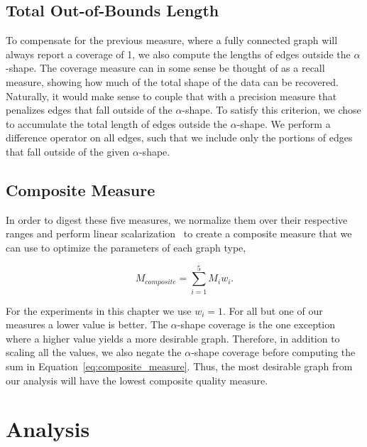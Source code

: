 \subsection{Total Out-of-Bounds Length}
%
To compensate for the previous measure, where a fully connected graph will always report a coverage of 1, we also compute the lengths of edges outside the $\alpha$-shape.
%
%
The coverage measure can in some sense be thought of as a recall measure, showing how much of the total shape of the data can be recovered.
%
Naturally, it would make sense to couple that with a precision measure that penalizes edges that fall outside of the $\alpha$-shape.
%
To satisfy this criterion, we chose to accumulate the total length of edges outside the $\alpha$-shape.
%
We perform a difference operator on all edges, such that we include only the portions of edges that fall outside of the given $\alpha$-shape.

\subsection{Composite Measure}
In order to digest these five measures, we normalize them over their respective ranges and perform linear scalarization~\cite{HwangMasud1979} to create a composite measure that we can use to optimize the parameters of each graph type,

\begin{equation}
    M_{composite} = \sum_{i=1}^5 M_iw_i.
\label{eq:composite_measure}
\end{equation}

For the experiments in this chapter we use $w_i=1$.
%
For all but one of our measures a lower value is better.
%
The $\alpha$-shape coverage is the one exception where a higher value yields a more desirable graph.
%
Therefore, in addition to scaling all the values, we also negate the $\alpha$-shape coverage before computing the sum in Equation~\ref{eq:composite_measure}.
%
Thus, the most desirable graph from our analysis will have the lowest composite quality measure.

\section{Analysis}

